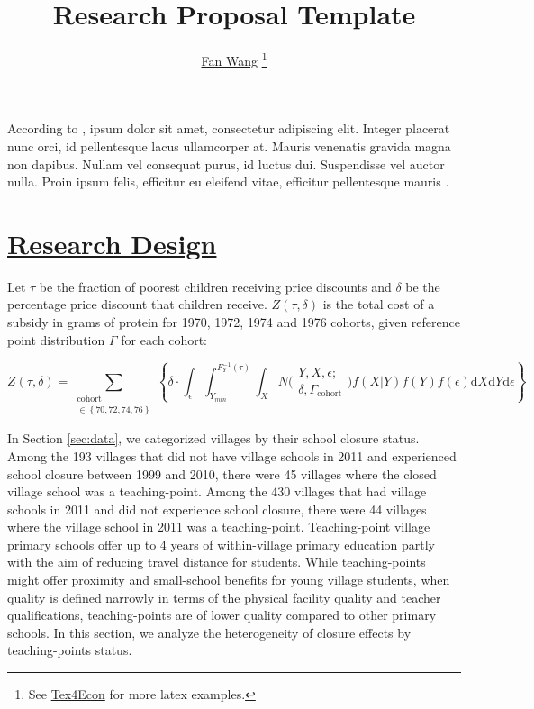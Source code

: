 \documentclass[12pt,english]{article}
\begin{document}
\fontsize{12}{14}\rm

\title{Research Proposal Template}

\author{\href{http://fanwangecon.github.io/}{Fan Wang} \thanks{See \href{https://fanwangecon.github.io/Tex4Econ/}{Tex4Econ} for more latex examples.}}

\maketitle


According to \textcite{becker_human_1986}, ipsum dolor sit amet, consectetur adipiscing elit. Integer placerat nunc orci, id pellentesque lacus ullamcorper at. Mauris venenatis gravida magna non dapibus. Nullam vel consequat purus, id luctus dui. Suspendisse vel auctor nulla. Proin ipsum felis, efficitur eu eleifend vitae, efficitur pellentesque mauris \autocite{case_lasting_2005, conti_understanding_2010}.

\section{\href{https://papers.ssrn.com/sol3/papers.cfm?abstract_id=3167023}{Research Design}\label{sec:design}}

Let $\tau$ be the fraction of poorest children receiving price discounts and $\delta$ be the percentage price discount that children receive. $Z\left(\tau,\delta\right)$ is the total cost of a subsidy in grams of protein for 1970, 1972, 1974 and 1976 cohorts, given reference point distribution $\Gamma$ for each cohort:

\begin{equation}
\label{eq:targetcost}
Z\left(\tau,\delta\right) =
\sum\limits_{
	\substack{
	\mathrm{cohort} \\ \in{\left\{70,72,74,76\right\}}}
	}
\left\{\delta\cdot
\int_{\epsilon}
\int_{Y_{min}}^{F_{Y}^{-1}\left(\tau\right)}
\int_{X}
N\Big(
\substack{
	Y,X,\epsilon; \\
	\delta, \Gamma_{\mathrm{cohort}}
}
\Big)f\left(X|Y\right)f\left(Y\right)f\left(\epsilon\right)\mathrm{d}X\mathrm{d}Y\mathrm{d}\epsilon\right\}
\end{equation}

In Section \ref{sec:data}, we categorized villages by their school closure status. Among the 193 villages that did not have village schools in 2011 and experienced school closure between 1999 and 2010, there were 45 villages where the closed village school was a teaching-point. Among the 430 villages that had village schools in 2011 and did not experience school closure, there were 44 villages where the village school in 2011 was a teaching-point. Teaching-point village primary schools offer up to 4 years of within-village primary education partly with the aim of reducing travel distance for students. While teaching-points might offer proximity and small-school benefits for young village students, when quality is defined  narrowly in terms of the physical facility quality and teacher qualifications, teaching-points are of lower quality compared to other primary schools. In this section, we analyze the heterogeneity of closure effects by teaching-points status.
\end{document}
